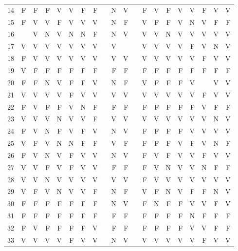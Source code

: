 \begin{apendicesenv}
\begin{center}
\begin{tabular}{ l r r r r r r r r r r r r r r r r r r r}
	14	&	F	&	F	&	F	&	V	&	V	&	F	&	F	&       &	N	&	V	&       &	F	&	V	&	F	&	V	&	V	&	F	&	V	&	V	\\
	15	&	F	&	V	&	V	&	F	&	V	&	V	&	V	&       &	N	&	F	&       &	V	&	F	&	F	&	V	&	N	&	V	&	F	&	F	\\
	16	&		&	V	&	N	&	V	&	N	&	N	&	F	&       &	N	&	V	&       &	V	&	V	&	N	&	V	&	V	&	V	&	V	&	V	\\
	17	&	V	&	V	&	V	&	V	&	V	&	V	&	V	&       &	V	&		&       &	V	&	V	&	V	&	V	&	F	&	V	&	N	&	V	\\
	18	&	F	&	V	&	V	&	V	&	V	&	V	&	V	&       &	V	&	V	&       &	V	&	V	&	V	&	V	&	V	&	F	&	V	&	V	\\
	19	&	V	&	F	&	F	&	F	&	F	&	F	&	F	&       &	F	&	F	&       &	F	&	F	&	F	&	F	&	F	&	F	&	F	&	F	\\
	20	&	F	&	F	&	N	&	V	&	F	&	F	&	V	&       &	N	&	F	&       &	V	&	F	&	F	&	F	&	V	&		&	V	&	V	\\
	21	&	V	&	V	&	V	&	V	&	F	&	V	&	V	&       &	V	&	V	&       &	V	&	V	&	V	&	V	&	V	&	F	&	V	&	V	\\
	22	&	F	&	V	&	F	&	F	&	V	&	N	&	F	&       &	F	&	F	&       &	F	&	F	&	F	&	F	&	F	&	V	&	F	&	F	\\
	23	&	V	&	V	&	V	&	N	&	V	&	V	&	F	&       &	V	&	V	&       &	V	&	V	&	V	&	V	&	V	&	V	&	N	&	V	\\
	24	&	F	&	V	&	N	&	F	&	V	&	F	&	V	&       &	N	&	V	&       &	F	&	F	&	F	&	F	&	V	&	V	&	V	&	V	\\
	25	&	V	&	F	&	V	&	N	&	N	&	F	&	F	&       &	V	&	F	&       &	F	&	F	&	F	&	V	&	F	&	V	&	N	&	F	\\
	26	&	F	&	V	&	N	&	V	&	F	&	V	&	V	&       &	N	&	V	&       &	F	&	V	&	F	&	V	&	V	&	F	&	V	&	V	\\
	27	&	V	&	V	&	F	&	V	&	F	&	V	&	V	&       &	F	&	F	&       &	F	&	V	&	N	&	V	&	V	&	N	&	F	&	F	\\
	28	&	V	&	V	&	N	&	V	&	V	&	V	&	V	&       &	V	&	V	&       &	F	&	V	&	V	&	V	&	V	&	V	&	V	&	V	\\
	29	&	V	&	F	&	V	&	N	&	V	&	V	&	F	&       &	N	&	F	&       &	V	&	F	&	N	&	V	&	F	&	F	&	N	&	V	\\
	30	&	F	&	F	&	F	&	F	&	F	&	F	&	F	&       &	N	&	V	&       &	F	&	N	&	F	&	F	&	V	&	V	&	F	&	V	\\
	31	&	F	&	F	&	F	&	F	&	F	&	F	&	F	&       &	F	&	F	&       &	F	&	F	&	F	&	F	&	N	&	F	&	F	&	F	\\
	32	&	F	&	V	&	F	&	F	&	F	&	F	&	V	&       &	F	&	F	&       &	F	&	F	&	F	&	F	&	V	&	V	&	F	&	F	\\
	33	&	V	&	V	&	V	&	V	&	F	&	V	&	V	&       &	N	&	V	&       &	V	&	V	&	V	&	V	&	V	&	F	&	V	&	V	\\
	

\end{tabular}
\end{center}
\end{apendicesenv}
